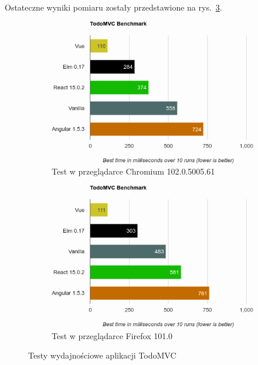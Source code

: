\documentclass[twoside,a4paper]{report}
\begin{document}
Ostateczne wyniki pomiaru zostały przedstawione na rys.~\ref{fig:perf}.
\begin{figure}[H]
    \centering
    \begin{subfigure}{.49\textwidth}
        \centering
        \includegraphics[width=1\textwidth]{img/perf_chromium}
        \caption{Test w przeglądarce Chromium 102.0.5005.61}\label{fig:perf_chromium}
    \end{subfigure}
    \begin{subfigure}{.49\textwidth}
        \centering
        \includegraphics[width=1\textwidth]{img/perf_firefox}
        \caption{Test w przeglądarce Firefox 101.0}\label{fig:perf_firefox}
    \end{subfigure}
    \caption{Testy wydajnościowe aplikacji TodoMVC}\label{fig:perf}
\end{figure}
\end{document}
